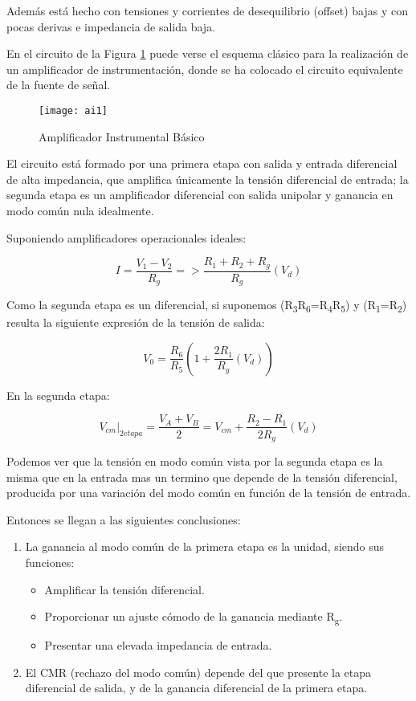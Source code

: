 Además está hecho con tensiones y corrientes de desequilibrio (offset) bajas y con pocas derivas e impedancia de salida baja.

En el circuito de la Figura \ref{fig:aibasico} puede verse el esquema clásico para la realización de un amplificador de instrumentación, donde se ha colocado el circuito equivalente de la fuente de señal.

\begin{figure}[h]
  \centering
  \texttt{[image: ai1]}
  \caption{Amplificador Instrumental Básico}\label{fig:aibasico}
\end{figure}

El circuito está formado por una primera etapa con salida y entrada diferencial de alta impedancia, que amplifica únicamente la tensión diferencial de entrada; la segunda etapa es un amplificador diferencial con salida unipolar y ganancia en modo común nula idealmente.

Suponiendo amplificadores operacionales ideales: 

\begin{equation}\label{eq1}
I = \frac{V_1 - V_2}{R_g}  => \frac{R_1+R_2+R_g}{R_g} (V_d)
\end{equation}

Como la segunda etapa es un diferencial, si suponemos (R\textsubscript{3}R\textsubscript{6}=R\textsubscript{4}R\textsubscript{5}) y  (R\textsubscript{1}=R\textsubscript{2}) resulta la siguiente expresión de la tensión de salida:

\begin{equation}\label{eq2}
V_0 = \frac{R_6}{R_5}(1 +\frac{2R_1}{R_g} (V_d))
\end{equation}

En la segunda etapa:

\begin{equation}\label{eq3}
V_{cm}|_{2etapa} = \frac{V_A + V_B}{2}=V_{cm} +\frac{R_2 - R_1}{2R_g}(V_d)
\end{equation}

Podemos ver que la tensión en modo común vista por la segunda etapa es la misma que en la entrada mas un termino que depende de la tensión diferencial, producida por una variación del modo común en función de la tensión de entrada.

Entonces se llegan a las siguientes conclusiones:
\begin{enumerate}
\item La ganancia al modo común de la primera etapa es la unidad, siendo sus funciones:
\begin{itemize}
\item Amplificar la tensión diferencial.
\item Proporcionar un ajuste cómodo de la ganancia mediante R\textsubscript{g}.
\item Presentar una elevada impedancia de entrada.
\end{itemize}
\item El CMR (rechazo del modo común) depende del que presente la etapa diferencial de salida, y de la ganancia diferencial de la primera etapa.
\end{enumerate}

